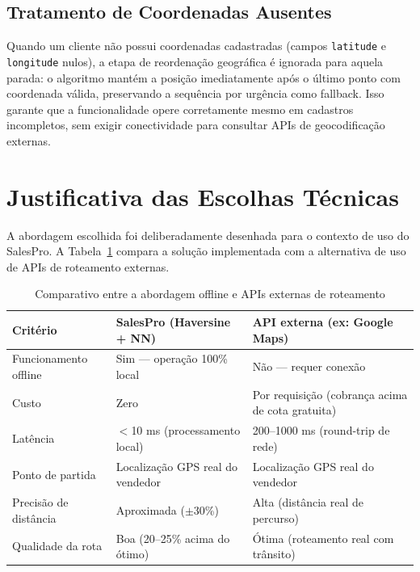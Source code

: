 \documentclass[
	12pt,				%
	oneside,			%
	a4paper,			%
	english,			%
	brazil				%
	]{abntex2}
\begin{document}
\subsection{Tratamento de Coordenadas Ausentes}

Quando um cliente não possui coordenadas cadastradas (campos \texttt{latitude} e \texttt{longitude} nulos), a etapa de reordenação geográfica é ignorada para aquela parada: o algoritmo mantém a posição imediatamente após o último ponto com coordenada válida, preservando a sequência por urgência como fallback. Isso garante que a funcionalidade opere corretamente mesmo em cadastros incompletos, sem exigir conectividade para consultar APIs de geocodificação externas.

\section{Justificativa das Escolhas Técnicas}

A abordagem escolhida foi deliberadamente desenhada para o contexto de uso do SalesPro. A Tabela~\ref{tab:rotas-comparativo} compara a solução implementada com a alternativa de uso de APIs de roteamento externas.

\begin{table}[htb]
\centering
\footnotesize
\begin{tabular}{|p{3.5cm}|p{4.5cm}|p{4.5cm}|}
  \hline
  \textbf{Critério} & \textbf{SalesPro (Haversine + NN)} & \textbf{API externa (ex: Google Maps)} \\
  \hline
  Funcionamento offline & Sim — operação 100\% local & Não — requer conexão \\
  \hline
  Custo & Zero & Por requisição (cobrança acima de cota gratuita) \\
  \hline
  Latência & $<$10 ms (processamento local) & 200--1000 ms (round-trip de rede) \\
  \hline
  Ponto de partida & Localização GPS real do vendedor & Localização GPS real do vendedor \\
  \hline
  Precisão de distância & Aproximada ($\pm$30\%) & Alta (distância real de percurso) \\
  \hline
  Qualidade da rota & Boa (20--25\% acima do ótimo) & Ótima (roteamento real com trânsito) \\
  \hline
\end{tabular}
\caption{Comparativo entre a abordagem offline e APIs externas de roteamento}
\label{tab:rotas-comparativo}
\end{table}
\end{document}
